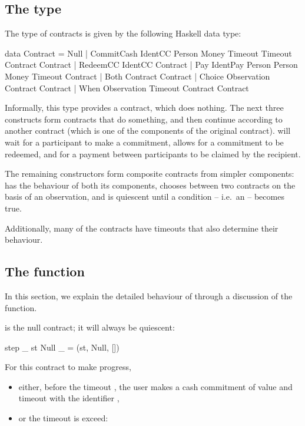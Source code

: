 \documentclass[runningheads]{llncs}
\begin{document}
\subsection{The  type}

The type of contracts is given by the following Haskell data type:

\begin{haskellcode}
data Contract =
   Null |
   CommitCash IdentCC Person Money Timeout Timeout Contract Contract |  
   RedeemCC IdentCC Contract |
   Pay IdentPay Person Person Money Timeout Contract |  
   Both Contract Contract |
   Choice Observation Contract Contract |
   When Observation Timeout Contract Contract   
   \end{haskellcode}
Informally, this type provides a  contract, which does nothing. The next three constructs form contracts that do something, and then continue according to another contract (which is one of the components of the original contract).  will wait for a participant to make a commitment,  
 allows for a commitment to be redeemed, and  for a payment between participants to be claimed by the recipient. 

The remaining constructors form composite contracts from simpler components:  has the behaviour of both its components,  chooses between two contracts on the basis of an observation, and  is quiescent until a condition -- i.e.\ an  -- becomes true.

Additionally, many of the contracts have timeouts that also determine their behaviour. 
\subsection{The  function}

In this section, we explain the detailed behaviour of  through a discussion of the  function.

\smallskip
\noindent
{} is the null contract; it will always be quiescent:

\begin{haskellcode}
step _ st Null _ = (st, Null, [])
\end{haskellcode}

\smallskip
\noindent
{}  For this contract to make 
progress,\begin{itemize}
\item either, before the timeout , the user  makes a cash commitment of 
value 
 and timeout   with the identifier , 
\item
or the timeout  is exceed:
\end{itemize} 
\end{document}
